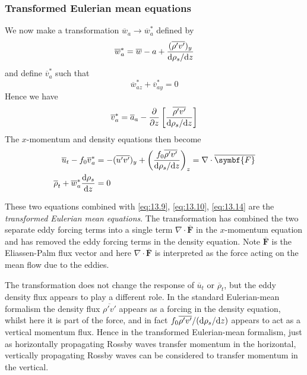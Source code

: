 \documentclass{jknotes}
\begin{document}
\subsubsection{Transformed Eulerian mean equations}
We now make a transformation $\overline{w}_a \to \overline{w}_a^*$ defined by
\begin{equation}
	\overline{w}_a^* = \overline{w}-a + \frac{(\overline{\rho' v'})_y}{\diffd
	\rho_s / \diffd z}
\end{equation}
and define $\overline{v}_a^*$ such that 
\begin{equation}
	\overline{w}_{az}^* + \overline{v}_{ay}^* = 0 \label{eq:13.14}
\end{equation}
Hence we have
\begin{equation}
	\overline{v}_a^* = \overline{a}_a - \frac{\partial}{\partial z} \left[
	\frac{\overline{\rho' v'}}{\diffd \rho_s/\diffd z}\right]
\end{equation}
The $x$-momentum and density equations then become
\begin{align}
	\overline{u}_t - f_0 \overline{v}_a^* &= -(\overline{u'v'})_y + \left(
	\frac{f_0 \overline{\rho'v'}}{\diffd \rho_s/\diffd z}\right)_z = \nabla
	\cdot \overline{\symbf{F}} \label{eq:13.16}\\
	\overline{\rho}_t + \overline{w}_a^* \frac{\diffd \rho_s}{\diffd z} &=
	0\label{eq:13.17}
\end{align}

These two equations combined with \eqref{eq:13.9}, \eqref{eq:13.10},
\eqref{eq:13.14} are the \emph{transformed Eulerian mean equations}. The
transformation has combined the two separate eddy forcing terms into a single
term $\nabla \cdot \overline{\symbf{F}}$ in the $x$-momentum equation and has
removed the eddy forcing terms in the density equation. Note
$\overline{\symbf{F}}$ is the Eliassen-Palm flux vector and here $\nabla \cdot
\overline{\symbf{F}}$ is interpreted as the force acting on the mean flow due
to the eddies. 

The transformation does not change the response of $\overline{u}_t$ or
$\overline{\rho}_t$, but the eddy density flux appears to play a different
role. In the standard Eulerian-mean formalism the density flux
$\overline{\rho'v'}$ appears as a forcing in the density equation, whilst here
it is part of the force, and in fact $f_0 \overline{\rho'v'}/(\diffd
\rho_s/\diffd z)$ appears to act as a vertical momentum flux. Hence in the
transformed Eulerian-mean formalism, just as horizontally propagating Rossby
waves transfer momentum in the horizontal, vertically propagating Rossby waves
can be considered to transfer momentum in the vertical.
\end{document}
